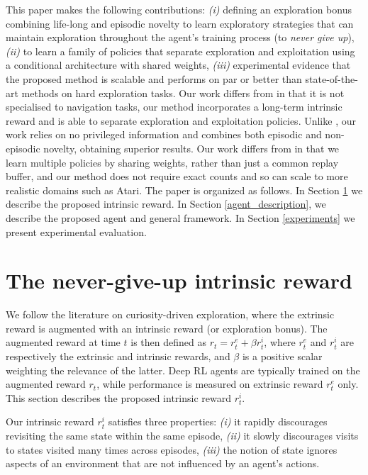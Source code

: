 \documentclass{article} %
\begin{document}
This paper makes the following contributions: \emph{(i)} defining an exploration bonus combining life-long and episodic novelty to learn exploratory strategies that can maintain exploration throughout the agent's training process (to \emph{never give up}), \emph{(ii)} to learn a family of policies that separate exploration and exploitation using a conditional architecture with shared weights, \emph{(iii)} experimental evidence that the proposed method is scalable and performs on par or better than state-of-the-art methods on hard exploration tasks.
Our work differs from \citet{savinov2018episodic} in that it is not specialised to navigation tasks, our method incorporates a long-term intrinsic reward and is able to separate exploration and exploitation policies. Unlike \citet{stanton2018deep}, our work relies on no privileged information and combines both episodic and non-episodic novelty, obtaining superior results.
%
Our work differs from \citet{beyer2019mulex} in that we learn multiple policies by sharing weights, rather than just a common replay buffer, and our method does not require exact counts and so can scale to more realistic domains such as Atari.
The paper is organized as follows. In Section \ref{learning_exploratory} we describe the proposed intrinsic reward. In Section \ref{agent_description}, we describe the proposed agent and general framework. In Section \ref{experiments} we present experimental evaluation.

\section{The never-give-up intrinsic reward}
\label{learning_exploratory}
%
We follow the literature on curiosity-driven exploration, where the extrinsic reward is augmented with an intrinsic reward (or exploration bonus).
The augmented reward at time $t$ is then defined as $r_t = r^e_t + \beta r^i_t$, where $r^e_t$ and $r^i_t$ are respectively the extrinsic and intrinsic rewards, and $\beta$ is a positive scalar weighting the relevance of the latter.
Deep RL agents are typically trained on the augmented reward $r_t$, while performance is measured on extrinsic reward $r^e_t$ only.
%
This section describes the proposed intrinsic reward $r^i_t$.

Our intrinsic reward $r^i_t$ satisfies three properties: \emph{(i)} it rapidly discourages revisiting the same state within the same episode, \emph{(ii)} it slowly discourages visits to states visited many times across episodes, \emph{(iii)} the notion of state ignores aspects of an environment that are not influenced by an agent's actions.
\end{document}
